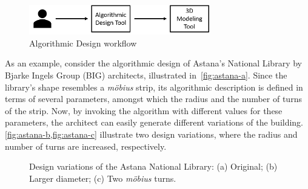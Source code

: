 \begin{figure}[htbp]
\centering
\includegraphics[width=0.70\textwidth]{./Images/Introduction/AlgorithmicArchitecturalDesign.png}
\caption[General view of the Algorithmic Design Approach]{Algorithmic Design workflow}
\label{fig:algorithmicdesign}
\end{figure}
	
	As an example, consider the algorithmic design of Astana's National Library by Bjarke Ingels Group (BIG) architects, illustrated in~\cref{fig:astana-a}. Since the library's shape resembles a \textit{möbius} strip, its algorithmic description is defined in terms of several parameters, amongst which the radius and the number of turns of the strip. Now, by invoking the algorithm with different values for these parameters, the architect can easily generate different variations of the building. \cref{fig:astana-b,fig:astana-c} illustrate two design variations, where the radius and number of turns are increased, respectively.
	
\begin{figure}[htbp]
\centering
{}%
\hfill
{}%
\hfill
{}%

\caption[Design variations of the Astana's National Library]{Design variations of the Astana National Library: (a) Original; (b) Larger diameter; (c) Two \textit{möbius} turns.}
\label{fig:astana}
\end{figure}

